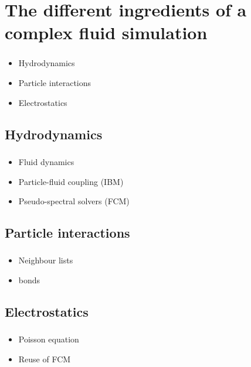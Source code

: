 \documentclass{beamer}
\begin{document}
\section{The different ingredients of a complex fluid simulation}

\begin{frame}
  \frametitle{\insertsectionnavigation{\linewidth}} 
  \begin{itemize}
  \item Hydrodynamics
  \item Particle interactions
  \item Electrostatics
  \end{itemize}
\end{frame}

\subsection{Hydrodynamics}
\begin{frame}
  \frametitle{\insertsubsectionnavigation{\linewidth}}
  \begin{itemize}
  \item Fluid dynamics
  \item Particle-fluid coupling (IBM)
  \item Pseudo-spectral solvers (FCM)
  \end{itemize}
\end{frame}

\subsection{Particle interactions}
\begin{frame}
  \frametitle{\insertsubsectionnavigation{\linewidth}}
  \begin{itemize}
  \item Neighbour lists
  \item bonds
  \end{itemize}
\end{frame}

\subsection{Electrostatics}
\begin{frame}
  \frametitle{\insertsubsectionnavigation{\linewidth}}
  \begin{itemize}
  \item Poisson equation
  \item Reuse of FCM
  \end{itemize}  
\end{frame}
    
\end{document}
